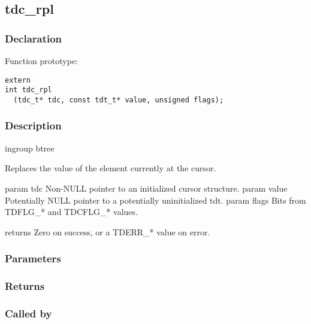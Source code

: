 
\newpage
\subsection{tdc\_rpl}
\subsubsection{Declaration} Function prototype:

\begin{verbatim}
extern
int tdc_rpl
  (tdc_t* tdc, const tdt_t* value, unsigned flags);
\end{verbatim}

\subsubsection{Description}


 ingroup btree

 Replaces the value of the element currently at the cursor.

 param tdc Non-NULL pointer to an initialized cursor structure.
 param value Potentially NULL pointer to a potentially uninitialized tdt.
 param flags Bits from TDFLG\_* and TDCFLG\_* values.

 returns Zero on success, or a TDERR\_* value on error.
 

\subsubsection{Parameters}
\subsubsection{Returns}
\subsubsection{Called by}
